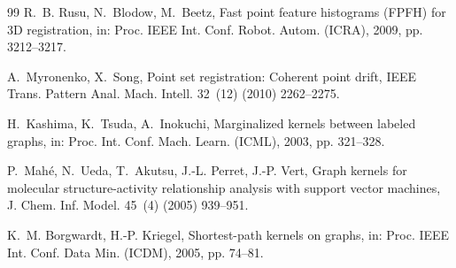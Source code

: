 \documentclass[a4paper,fleqn]{cas-dc}
\theoremstyle{thmstyleone}
\theoremstyle{thmstyletwo}
\theoremstyle{thmstylethree}
\begin{document}
\begin{thebibliography}{99}
R.~B. Rusu, N.~Blodow, M.~Beetz, Fast point feature histograms ({FPFH}) for 3{D} registration, in: Proc. IEEE Int. Conf. Robot. Autom. (ICRA), 2009, pp. 3212--3217.

A.~Myronenko, X.~Song, Point set registration: Coherent point drift, IEEE Trans. Pattern Anal. Mach. Intell. 32~(12) (2010) 2262--2275.

H.~Kashima, K.~Tsuda, A.~Inokuchi, Marginalized kernels between labeled graphs, in: Proc. Int. Conf. Mach. Learn. (ICML), 2003, pp. 321--328.

P.~Mah\'e, N.~Ueda, T.~Akutsu, J.-L. Perret, J.-P. Vert, Graph kernels for molecular structure-activity relationship analysis with support vector machines, J. Chem. Inf. Model. 45~(4) (2005) 939--951.

K.~M. Borgwardt, H.-P. Kriegel, Shortest-path kernels on graphs, in: Proc. IEEE Int. Conf. Data Min. (ICDM), 2005, pp. 74--81.

\end{thebibliography}
\end{document}
